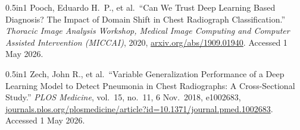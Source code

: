 \documentclass[12pt,letterpaper]{article}
\begin{document}
\vspace{0.5em}

\begin{hangparas}{0.5in}{1}
Pooch, Eduardo H.\ P., et al.\ ``Can We Trust Deep Learning Based Diagnosis? The Impact of Domain Shift in Chest Radiograph Classification.'' \textit{Thoracic Image Analysis Workshop, Medical Image Computing and Computer Assisted Intervention (MICCAI)}, 2020, \url{arxiv.org/abs/1909.01940}. Accessed 1 May 2026.
\end{hangparas}

\vspace{0.5em}

\begin{hangparas}{0.5in}{1}
Zech, John R., et al.\ ``Variable Generalization Performance of a Deep Learning Model to Detect Pneumonia in Chest Radiographs: A Cross-Sectional Study.'' \textit{PLOS Medicine}, vol.\ 15, no.\ 11, 6 Nov.\ 2018, e1002683, \url{journals.plos.org/plosmedicine/article?id=10.1371/journal.pmed.1002683}. Accessed 1 May 2026.
\end{hangparas}
\end{document}
